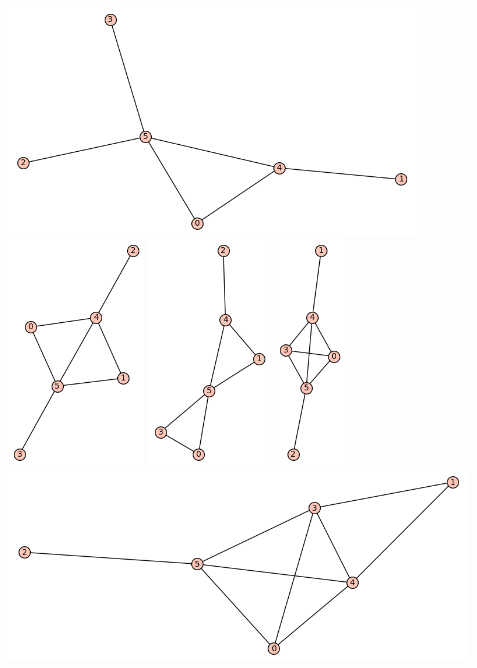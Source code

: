 \documentclass[10pt, a4paper]{article}
\begin{document}
\begin{center}
\includegraphics[height=6cm]{min_graf_6_1}
\includegraphics[height=6cm]{min_graf_6_2}
\includegraphics[height=6cm]{min_graf_6_3}
\includegraphics[height=6cm]{min_graf_6_4}
\includegraphics[height=5cm]{min_graf_6_5}
\end{center}
\end{document}
